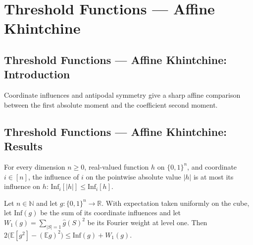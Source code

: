 \section{Threshold Functions --- Affine Khintchine}
\subsection*{Threshold Functions --- Affine Khintchine: Introduction}
Coordinate influences and antipodal symmetry give a sharp affine comparison between the first absolute moment and the coefficient second moment.

\subsection*{Threshold Functions --- Affine Khintchine: Results}

\begin{lemma}
\leanok
{}
For every dimension $n\ge0$, real-valued function $h$ on $\{0,1\}^n$, and coordinate
$i\in[n]$, the influence of $i$ on the pointwise absolute value $|h|$ is at most its
influence on $h$: $\mathrm{Inf}_i[|h|]\le \mathrm{Inf}_i[h]$.
\end{lemma}

\begin{lemma}
\leanok
{}
Let $n\in\mathbb N$ and let $g:\{0,1\}^n\to\mathbb R$. With expectation taken uniformly
on the cube, let $\mathrm{Inf}(g)$ be the sum of its coordinate influences and let
$W_1(g)=\sum_{|S|=1}\widehat g(S)^2$ be its Fourier weight at level one. Then
$2\bigl(\mathbb E[g^2]-(\mathbb E g)^2\bigr)\le \mathrm{Inf}(g)+W_1(g)$.
\end{lemma}

